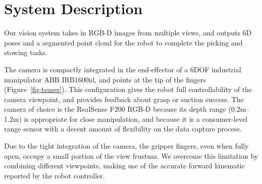 \documentclass[letterpaper, 10 pt, conference]{ieeeconf}  %
\newcommand{\figref}[1]{Figure~\ref{#1}}
\newcommand{\myparagraph}[1]{\vspace{0.1in}\noindent\textbf{#1}}
\begin{document}
\section{System Description}
Our vision system takes in RGB-D images from multiple views, and outputs 6D poses and a segmented point cloud for the robot to complete the picking and stowing tasks. 




The camera is compactly integrated in the end-effector of a 6DOF industrial manipulator ABB IRB1600id, and points at the tip of the fingers (\figref{fig:teaser}). This configuration gives the robot full controllability of the camera viewpoint, and provides feedback about grasp or suction success.
%
%
%
The camera of choice is the RealSense F200 RGB-D because its depth range (0.2m--1.2m) is appropriate for close manipulation, and because it is a consumer-level range sensor with a decent amount of flexibility on the data capture process. 

Due to the tight integration of the camera, the gripper fingers, even when fully open, occupy a small portion of the view frustum. We overcome this limitation by combining different viewpoints, making use of the accurate forward kinematic reported by the robot controller.


\end{document}
